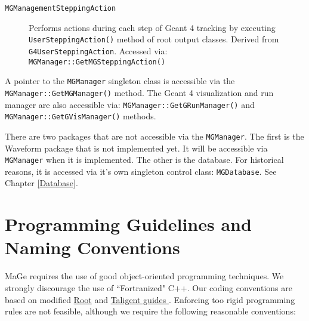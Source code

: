 \begin{description}
\item[{\nolinkurl{MGManagementSteppingAction}}] 

          Performs actions during each step of Geant 4 tracking by  
         executing \texttt{U\-s\-e\-r\-S\-t\-e\-p\-p\-i\-n\-g\-A\-c\-t\-i\-o\-n\-(\-)}          method of root output classes.
	 Derived from \nolinkurl{G4UserSteppingAction}.
	 Accessed via:
 \texttt{M\-G\-M\-a\-n\-a\-g\-e\-r\-:\-:\-G\-e\-t\-M\-G\-S\-t\-e\-p\-p\-i\-n\-g\-A\-c\-t\-i\-o\-n\-(\-)}  



\end{description}

       A pointer to the \texttt{M\-G\-M\-a\-n\-a\-g\-e\-r} singleton 
      class is accessible via the 
 \texttt{M\-G\-M\-a\-n\-a\-g\-e\-r\-:\-:\-G\-e\-t\-M\-G\-M\-a\-n\-a\-g\-e\-r\-(\-)} method.
      The Geant 4 visualization and run manager are also accessible via:
 \texttt{M\-G\-M\-a\-n\-a\-g\-e\-r\-:\-:\-G\-e\-t\-G\-R\-u\-n\-M\-a\-n\-a\-g\-e\-r\-(\-)} and
 \texttt{M\-G\-M\-a\-n\-a\-g\-e\-r\-:\-:\-G\-e\-t\-G\-V\-i\-s\-M\-a\-n\-a\-g\-e\-r\-(\-)} methods.
 

       There are two packages that are not accessible via the 
 \texttt{M\-G\-M\-a\-n\-a\-g\-e\-r}. The first is the Waveform
      package that is not implemented yet. It will be accessible via 
 \texttt{M\-G\-M\-a\-n\-a\-g\-e\-r} when it is implemented. 
      The other
      is the database. For historical reasons, it is accessed via it's own
      singleton control class: \texttt{M\-G\-D\-a\-t\-a\-b\-a\-s\-e}. See
 Chapter \ref{Database}.
 

\section{Programming Guidelines and Naming Conventions}

   MaGe requires the use of good object-{}oriented programming techniques.
  We strongly discourage the use of ``Fortranized" C++. Our coding conventions
  are based on modified  
 \href{http://root.cern.ch/root/Conventions.html}{Root} and 
 \href{http://pcroot.cern.ch/TaligentDocs/TaligentOnline/DocumentRoot/1.0/Docs/books/WM/WM_3.html}{   Taligent guides }. Enforcing too rigid 
  programming rules are not feasible, although we require the following 
  reasonable conventions:
 
